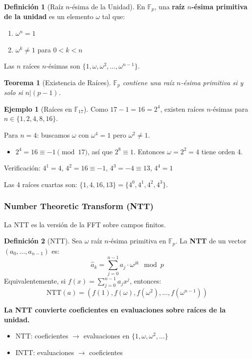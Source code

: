 \documentclass[11pt,a4paper,twoside,openright]{book}
\theoremstyle{definition}
\newtheorem{definition}{Definición}[chapter]
\newtheorem{example}{Ejemplo}[chapter]
\theoremstyle{plain}
\newtheorem{theorem}{Teorema}[chapter]
\theoremstyle{remark}
\begin{document}
\begin{definition}[Raíz $n$-ésima de la Unidad]
En $\mathbb{F}_p$, una \textbf{raíz $n$-ésima primitiva de la unidad} es un elemento $\omega$ tal que:
\begin{enumerate}
    \item $\omega^n = 1$
    \item $\omega^k \neq 1$ para $0 < k < n$
\end{enumerate}
Las $n$ raíces $n$-ésimas son $\{1, \omega, \omega^2, \ldots, \omega^{n-1}\}$.
\end{definition}

\begin{theorem}[Existencia de Raíces]
$\mathbb{F}_p$ contiene una raíz $n$-ésima primitiva si y solo si $n | (p-1)$.
\end{theorem}

\begin{example}[Raíces en $\mathbb{F}_{17}$]
Como $17 - 1 = 16 = 2^4$, existen raíces $n$-ésimas para $n \in \{1, 2, 4, 8, 16\}$.

Para $n = 4$: buscamos $\omega$ con $\omega^4 = 1$ pero $\omega^2 \neq 1$.
\begin{itemize}
    \item $2^4 = 16 \equiv -1 \pmod{17}$, así que $2^8 \equiv 1$. Entonces $\omega = 2^2 = 4$ tiene orden 4.
\end{itemize}
Verificación: $4^1 = 4$, $4^2 = 16 \equiv -1$, $4^3 = -4 \equiv 13$, $4^4 = 1$ \checkmark

Las 4 raíces cuartas son: $\{1, 4, 16, 13\} = \{4^0, 4^1, 4^2, 4^3\}$.
\end{example}

\subsubsection{Number Theoretic Transform (NTT)}

La NTT es la versión de la FFT sobre campos finitos.

\begin{definition}[NTT]
Sea $\omega$ raíz $n$-ésima primitiva en $\mathbb{F}_p$. La \textbf{NTT} de un vector $(a_0, \ldots, a_{n-1})$ es:
\[ \hat{a}_k = \sum_{j=0}^{n-1} a_j \cdot \omega^{jk} \mod p \]
Equivalentemente, si $f(x) = \sum_{j=0}^{n-1} a_j x^j$, entonces:
\[ \text{NTT}(a) = (f(1), f(\omega), f(\omega^2), \ldots, f(\omega^{n-1})) \]
\end{definition}

\begin{keyidea}
\textbf{La NTT convierte coeficientes en evaluaciones sobre raíces de la unidad.}
\begin{itemize}
    \item NTT: coeficientes $\to$ evaluaciones en $\{1, \omega, \omega^2, \ldots\}$
    \item INTT: evaluaciones $\to$ coeficientes
\end{itemize}
\end{keyidea}
\end{document}
